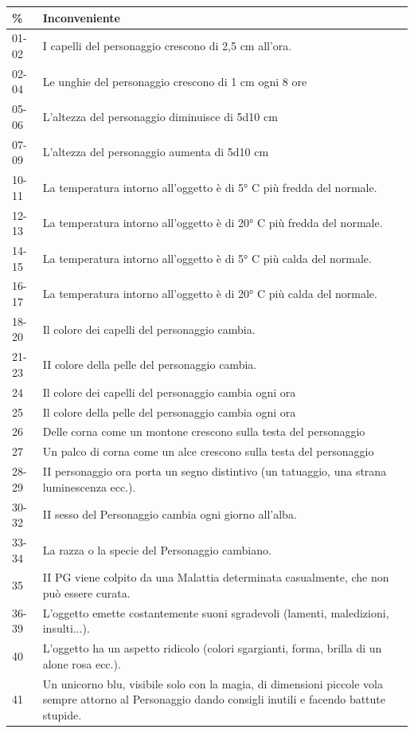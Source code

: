 {\small
	\begin{tabularx}{0.95\textwidth}{lX}
		\textbf{\%} & \textbf{Inconveniente}\\
		\toprule
		01-02& I capelli del personaggio crescono di 2,5 cm all'ora.\\
		02-04& Le unghie del personaggio crescono di 1 cm ogni 8 ore\\
		05-06   & L'altezza del personaggio diminuisce di 5d10 cm \\
		07-09   & L'altezza del personaggio aumenta di 5d10 cm \\
		10-11   & La temperatura intorno all'oggetto è di 5° C più fredda del normale.\\
		12-13   & La temperatura intorno all'oggetto è di 20° C più fredda del normale.\\
		14-15   & La temperatura intorno all'oggetto è di 5° C più calda del normale.\\
		16-17   & La temperatura intorno all'oggetto è di 20° C più calda del normale.\\
		18-20   & Il colore dei capelli del personaggio cambia.\\
		21-23   & II colore della pelle del personaggio cambia.\\
		24& Il colore dei capelli del personaggio cambia ogni ora\\
		25& Il colore della pelle del personaggio cambia ogni ora\\
		26      & Delle corna come un montone crescono sulla testa del personaggio\\
		27      & Un palco di corna come un alce crescono sulla testa del personaggio\\
		28-29   & II personaggio ora porta un segno distintivo (un tatuaggio, una strana luminescenza ecc.).\\
		30-32   & II sesso del Personaggio cambia ogni giorno all'alba.\\
		33-34   & La razza o la specie del Personaggio cambiano.\\
		35      & II PG viene colpito da una Malattia determinata casualmente, che non può essere curata.\\
		36-39   & L'oggetto emette costantemente suoni sgradevoli (lamenti, maledizioni, insulti...).\\
		40      & L'oggetto ha un aspetto ridicolo (colori sgargianti, forma, brilla di un alone rosa ecc.).\\
		41      & Un unicorno blu, visibile solo con la magia, di dimensioni piccole vola sempre attorno al Personaggio dando consigli inutili e facendo battute stupide.\\

\end{tabularx}}
